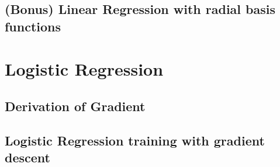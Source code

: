 \documentclass{article}
\begin{document}
\subsection{(Bonus) Linear Regression with radial basis functions}


\section{Logistic Regression}

\subsection{Derivation of Gradient}

\subsection{Logistic Regression training with gradient descent}
\end{document}
